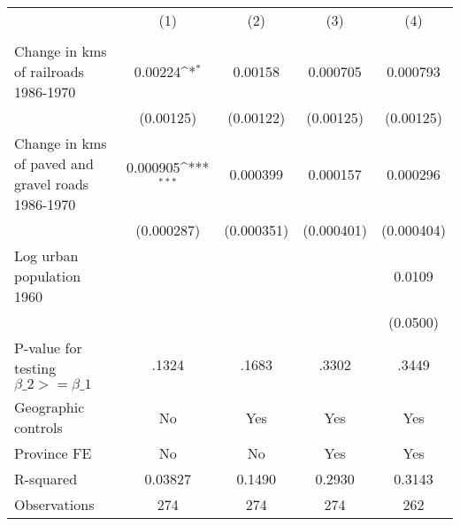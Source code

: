 {
\def\sym#1{\ifmmode^{#1}\else\(^{#1}\)\fi}
\begin{tabular}{l*{4}{c}}
\hline\hline
                &\multicolumn{1}{c}{(1)}&\multicolumn{1}{c}{(2)}&\multicolumn{1}{c}{(3)}&\multicolumn{1}{c}{(4)}\\
                &\multicolumn{1}{c}{}&\multicolumn{1}{c}{}&\multicolumn{1}{c}{}&\multicolumn{1}{c}{}\\
\hline
Change in kms of railroads 1986-1970&  0.00224\sym{*}  &  0.00158         & 0.000705         & 0.000793         \\
                &(0.00125)         &(0.00122)         &(0.00125)         &(0.00125)         \\
[1em]
Change in kms of paved and gravel roads 1986-1970& 0.000905\sym{***}& 0.000399         & 0.000157         & 0.000296         \\
                &(0.000287)         &(0.000351)         &(0.000401)         &(0.000404)         \\
[1em]
Log urban population 1960&                  &                  &                  &   0.0109         \\
                &                  &                  &                  & (0.0500)         \\
\hline
P-value for testing $\beta\_{2} >= \beta\_{1}$&    .1324         &    .1683         &    .3302         &    .3449         \\
Geographic controls&       No         &      Yes         &      Yes         &      Yes         \\
Province FE     &       No         &       No         &      Yes         &      Yes         \\
R-squared       &  0.03827         &   0.1490         &   0.2930         &   0.3143         \\
Observations    &      274         &      274         &      274         &      262         \\
\hline\hline
\end{tabular}
}
